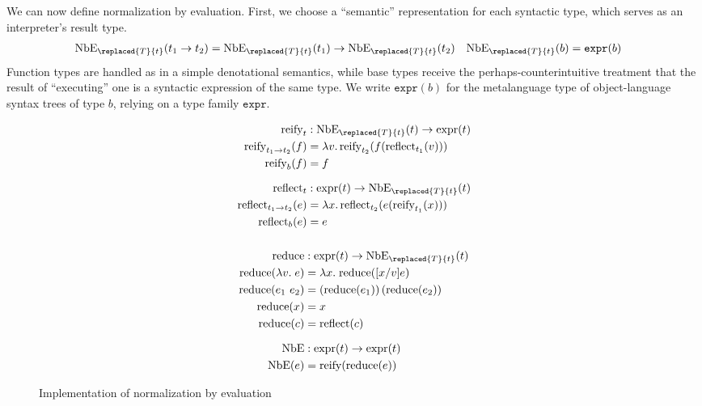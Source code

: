 \documentclass[sn-mathphys,pdflatex]{sn-jnl}%
\newcommand{\defeq}{=}
\theoremstyle{thmstyleone}%
\theoremstyle{thmstyletwo}%
\theoremstyle{thmstylethree}%
\begin{document}
We can now define normalization by evaluation.
First, we choose a ``semantic'' representation for each syntactic type, which serves as an interpreter's result type.
\begin{align*}
  \text{NbE}_{\replaced{T}{t}}(t_1 \to t_2) & \defeq \text{NbE}_{\replaced{T}{t}}(t_1) \to \text{NbE}_{\replaced{T}{t}}(t_2)
  & \text{NbE}_{\replaced{T}{t}}(b) & \defeq \texttt{expr}(b)
\end{align*}
Function types are handled as in a simple denotational semantics, while base types receive the perhaps-counterintuitive treatment that the result of ``executing'' one is a syntactic expression of the same type.
We write $\texttt{expr}(b)$ for the metalanguage type of object-language syntax trees of type $b$, relying on a type family $\texttt{expr}$.

\begin{figure}%
  \small
  \begin{subfigure}[t]{0.5\textwidth}
    \begin{align*}
      \text{reify}_t & : \text{NbE}_{\replaced{T}{t}}(t) \to \text{expr}(t) \\
      \text{reify}_{t_1 \to t_2}(f) & \defeq \lambda v.\,\text{reify}_{t_2}(f(\text{reflect}_{t_1}(v))) \\
      \text{reify}_{b}(f) & \defeq f \\ \noalign{\vskip7pt}
      \text{reflect}_t & : \text{expr}(t) \to \text{NbE}_{\replaced{T}{t}}(t) \\
      \text{reflect}_{t_1\to t_2}(e) & \defeq \lambda x.\,\text{reflect}_{t_2}(e(\text{reify}_{t_1}(x))) \\
      \text{reflect}_{b}(e) & \defeq e \\ \noalign{\vskip7pt}
    \end{align*}
  \end{subfigure}
  \begin{subfigure}[t]{0.5\textwidth}
    \begin{align*}
      \text{reduce} & : \text{expr}(t) \to \text{NbE}_{\replaced{T}{t}}(t) \\
      \text{reduce}(\lambda v. \; e) & \defeq \lambda x. \; \text{reduce}([x/v]e) \\
      \text{reduce}(e_1~e_2) & \defeq \left(\text{reduce}(e_1)\right)(\text{reduce}(e_2)) \\
      \text{reduce}(x) & \defeq x \\
      \text{reduce}(c) & \defeq \text{reflect}(c) \\ \noalign{\vskip7pt}
      \text{NbE} & : \text{expr}(t) \to \text{expr}(t) \\
      \text{NbE}(e) & \defeq \text{reify}(\text{reduce}(e))
    \end{align*}
  \end{subfigure}
\caption{\label{fig:nbe}Implementation of normalization by evaluation}
\end{figure}
\end{document}
